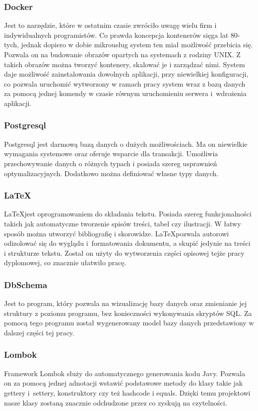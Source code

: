 \subsubsection{Docker}
Jest to narzędzie, które w ostatnim czasie zwróciło uwagę wielu firm i indywidualnych programistów. Co prawda koncepcja kontenerów sięga lat 80-tych, jednak dopiero w dobie mikrousług system ten miał możliwość przebicia się. Pozwala on na budowanie obrazów opartych na systemach z rodziny UNIX. Z takich obrazów można tworzyć kontenery, skalować je i zarządzać nimi. System daje możliwość zainstalowania dowolnych aplikacji, przy niewielkiej konfiguracji, co pozwala uruchomić wytworzony w ramach pracy system wraz z bazą danych za pomocą jednej komendy w czasie równym uruchomieniu serwera i~wdrożenia aplikacji.

\subsubsection{Postgresql}
Postgresql jest darmową bazą danych o dużych możliwościach. Ma on niewielkie wymagania systemowe oraz oferuje wsparcie dla transakcji. Umożliwia przechowywanie danych o różnych typach i posiada szereg usprawnień optymalizacyjnych. Dodatkowo można definiować własne typy danych.

\subsubsection{\LaTeX}
\LaTeX jest oprogramowaniem do składania tekstu. Posiada szereg funkcjonalności takich jak automatyczne tworzenie spisów treści, tabel czy ilustracji. W łatwy sposób można utworzyć bibliografię i skorowidze. \LaTeX pozwala autorowi odizolować się do wyglądu i~formatowania dokumentu, a skupić jedynie na treści i strukturze tekstu. Został on użyty do wytworzenia części opisowej tejże pracy dyplomowej, co znacznie ułatwiło pracę.

\subsubsection{DbSchema}
Jest to program, który pozwala na wizualizację bazy danych oraz zmienianie jej struktury z poziomu programu, bez konieczności wykonywania skryptów SQL. Za pomocą tego programu został wygenerowany model bazy danych przedstawiony w dalszej części tej pracy.

\subsubsection{Lombok}
Framework Lombok służy do automatycznego generowania kodu Javy. Pozwala on za pomocą jednej adnotacji wstawić podstawowe metody do klasy takie jak gettery i~settery, konstruktory czy też hashcode i equals. Dzięki temu projektowi nasze klasy zostaną znacznie odchudzone przez co zyskują na czytelności.
